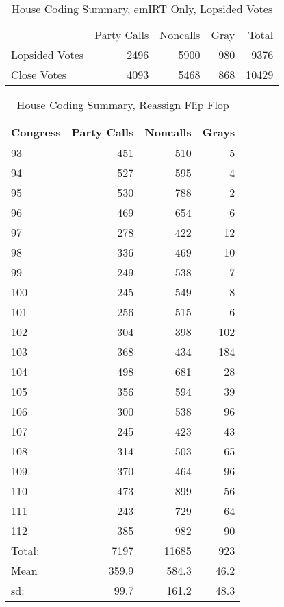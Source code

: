 \documentclass[12pt]{article}
\begin{document}
\begin{table}[ht]
	\caption{House Coding Summary, emIRT Only, Lopsided Votes}
	\centering
	\begin{tabular}{lrrrr}
		\hline
		& Party Calls & Noncalls & Gray & Total \\
		Lopsided Votes & 2496 & 5900 & 980 & 9376 \\
		Close Votes & 4093 & 5468 & 868 & 10429 \\
		\hline
		
	\end{tabular}
\end{table}

\begin{table}[ht]
	\caption{House Coding Summary, Reassign Flip Flop}
	\centering
	\begin{tabular}{lrrr}
		\hline
		Congress & Party Calls & Noncalls & Grays \\ 
		\hline
		93 & 451 & 510 &   5 \\ 
		94 & 527 & 595 &   4 \\ 
		95 & 530 & 788 &   2 \\ 
		96 & 469 & 654 &   6 \\ 
		97 & 278 & 422 &  12 \\ 
		98 & 336 & 469 &  10 \\ 
		99 & 249 & 538 &   7 \\ 
		100 & 245 & 549 &   8 \\ 
		101 & 256 & 515 &   6 \\ 
		102 & 304 & 398 & 102 \\ 
		103 & 368 & 434 & 184 \\ 
		104 & 498 & 681 &  28 \\ 
		105 & 356 & 594 &  39 \\ 
		106 & 300 & 538 &  96 \\ 
		107 & 245 & 423 &  43 \\ 
		108 & 314 & 503 &  65 \\ 
		109 & 370 & 464 &  96 \\ 
		110 & 473 & 899 &  56 \\ 
		111 & 243 & 729 &  64 \\ 
		112 & 385 & 982 &  90 \\ 
		\hline
		Total: & 7197 & 11685 & 923 \\
		Mean & 359.9 & 584.3 & 46.2 \\
		sd: & 99.7 & 161.2 &  48.3 \\
		\hline
	\end{tabular}
\end{table}
\end{document}
